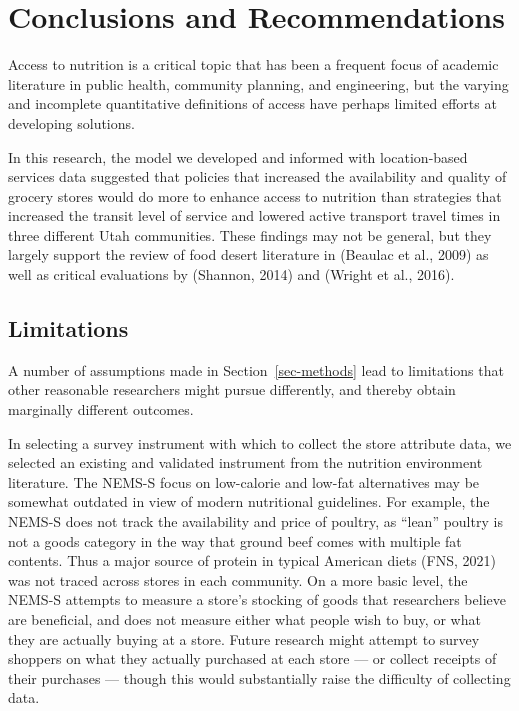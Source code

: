 \documentclass[
  letterpaper,
  number,
  review,
  doubleblind,
  3p]{elsarticle}
\begin{document}

\section{Conclusions and Recommendations}\label{sec-conclude}

Access to nutrition is a critical topic that has been a frequent focus
of academic literature in public health, community planning, and
engineering, but the varying and incomplete quantitative definitions of
access have perhaps limited efforts at developing solutions.

In this research, the model we developed and informed with
location-based services data suggested that policies that increased the
availability and quality of grocery stores would do more to enhance
access to nutrition than strategies that increased the transit level of
service and lowered active transport travel times in three different
Utah communities. These findings may not be general, but they largely
support the review of food desert literature in (Beaulac et al., 2009)
as well as critical evaluations by (Shannon, 2014) and (Wright et al.,
2016).

\subsection{Limitations}\label{sec-limitations}

A number of assumptions made in Section~\ref{sec-methods} lead to
limitations that other reasonable researchers might pursue differently,
and thereby obtain marginally different outcomes.

In selecting a survey instrument with which to collect the store
attribute data, we selected an existing and validated instrument from
the nutrition environment literature. The NEMS-S focus on low-calorie
and low-fat alternatives may be somewhat outdated in view of modern
nutritional guidelines. For example, the NEMS-S does not track the
availability and price of poultry, as ``lean'' poultry is not a goods
category in the way that ground beef comes with multiple fat contents.
Thus a major source of protein in typical American diets (FNS, 2021) was
not traced across stores in each community. On a more basic level, the
NEMS-S attempts to measure a store's stocking of goods that researchers
believe are beneficial, and does not measure either what people wish to
buy, or what they are actually buying at a store. Future research might
attempt to survey shoppers on what they actually purchased at each store
--- or collect receipts of their purchases --- though this would
substantially raise the difficulty of collecting data.
\end{document}
